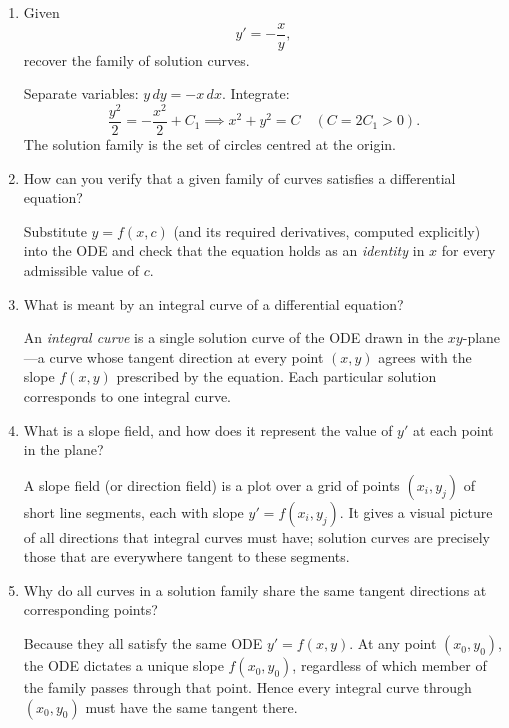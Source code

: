 \documentclass{essay}
\begin{document}
\begin{enumerate}[leftmargin=*, itemsep=8pt]
  \item Given \[ y'=-\frac{x}{y}, \] recover the family of solution curves.

    \begin{answer} Separate variables: $y\,dy = -x\,dx$.  Integrate:
      \[
        \frac{y^2}{2} = -\frac{x^2}{2} + C_1 \implies x^2+y^2 = C \quad
        (C=2C_1>0).
      \]
      The solution family is the set of circles centred at the origin.
    \end{answer}

  \item How can you verify that a given family of curves satisfies a
    differential equation?

    \begin{answer} Substitute $y=f(x,c)$ (and its required
      derivatives, computed explicitly) into the ODE and check that the
      equation holds as an \emph{identity} in $x$ for every admissible
      value of $c$.
    \end{answer}

  \item What is meant by an integral curve of a differential equation?

    \begin{answer} An \emph{integral curve} is a single solution
      curve of the ODE drawn in the $xy$-plane---a curve whose tangent
      direction at every point $(x,y)$ agrees with the slope $f(x,y)$
      prescribed by the equation.  Each particular solution corresponds
      to one integral curve.
    \end{answer}

  \item What is a slope field, and how does it represent the value of
    $y'$ at each point in the plane?

    \begin{answer} A slope field (or direction field) is a plot
      over a grid of points $(x_i,y_j)$ of short line segments, each
      with slope $y'=f(x_i,y_j)$.  It gives a visual picture of all
      directions that integral curves must have; solution curves are
      precisely those that are everywhere tangent to these segments.
    \end{answer}

  \item Why do all curves in a solution family share the same tangent
    directions at corresponding points?

    \begin{answer} Because they all satisfy the same ODE
      $y'=f(x,y)$.  At any point $(x_0,y_0)$, the ODE dictates a unique
      slope $f(x_0,y_0)$, regardless of which member of the family
      passes through that point.  Hence every integral curve through
      $(x_0,y_0)$ must have the same tangent there.
    \end{answer}


\end{enumerate}
\end{document}
